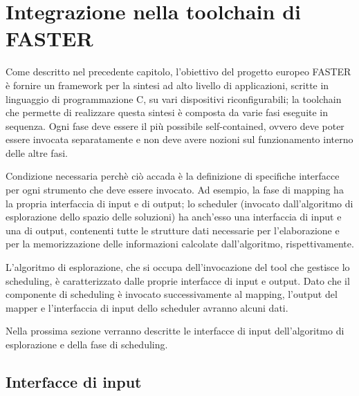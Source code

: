 \section{Integrazione nella toolchain di \acs{FASTER}}
\label{sec:integrazioneToolchainFASTER}

Come descritto nel precedente capitolo, l'obiettivo del progetto europeo 
\ac{FASTER} è fornire un framework per la sintesi ad alto livello di 
applicazioni, scritte in linguaggio di programmazione C, su vari dispositivi 
riconfigurabili; la toolchain che permette di realizzare questa sintesi è 
composta da varie fasi eseguite in sequenza. Ogni fase deve essere il più 
possibile self-contained, ovvero deve poter essere invocata separatamente e non 
deve avere nozioni sul funzionamento interno delle altre fasi.

Condizione necessaria perchè ciò accada è la definizione di specifiche 
interfacce per ogni strumento che deve essere invocato. Ad esempio, la fase di 
mapping ha la propria interfaccia di input e di output; lo scheduler 
(invocato dall'algoritmo di esplorazione dello spazio delle soluzioni) ha 
anch'esso una interfaccia di input e una di output, contenenti tutte 
le strutture dati necessarie per l'elaborazione e per la memorizzazione delle 
informazioni calcolate dall'algoritmo, rispettivamente. 



L'algoritmo di esplorazione, che si occupa dell'invocazione del tool che gestisce lo 
scheduling, è caratterizzato dalle proprie interfacce di input e output. Dato che il componente
di scheduling \`e invocato successivamente al mapping, l'output del mapper e l'interfaccia
di input dello scheduler avranno alcuni dati.

Nella prossima sezione verranno descritte le interfacce di input dell'algoritmo di esplorazione
e della fase di scheduling.

\subsection{Interfacce di input}

